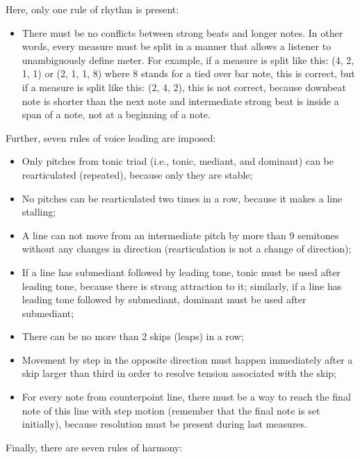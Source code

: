 \documentclass{article}
\begin{document}
Here, only one rule of rhythm is present:
\begin{itemize}
	\item There must be no conflicts between strong beats and longer notes. In other words, every measure must be split in a manner that allows a listener to unambiguously define meter. For example, if a measure is split like this: (4, 2, 1, 1) or (2, 1, 1, 8) where 8 stands for a tied over bar note, this is correct, but if a measure is split like this: (2, 4, 2), this is not correct, because downbeat note is shorter than the next note and intermediate strong beat is inside a span of a note, not at a beginning of a note.
\end{itemize}
Further, seven rules of voice leading are imposed:
\begin{itemize}
	\item Only pitches from tonic triad (i.e., tonic, mediant, and dominant) can be rearticulated (repeated), because only they are stable;
	\item No pitches can be rearticulated two times in a row, because it makes a line stalling;
	\item A line can not move from an intermediate pitch by more than 9 semitones without any changes in direction (rearticulation is not a change of direction);
	\item If a line has submediant followed by leading tone, tonic must be used after leading tone, because there is strong attraction to it; similarly, if a line has leading tone followed by submediant, dominant must be used after submediant;
	\item There can be no more than 2 skips (leaps) in a row;
	\item Movement by step in the opposite direction must happen immediately after a skip larger than third in order to resolve tension associated with the skip;
	\item For every note from counterpoint line, there must be a way to reach the final note of this line with step motion (remember that the final note is set initially), because resolution must be present during last measures.
\end{itemize}
Finally, there are seven rules of harmony:
\end{document}
